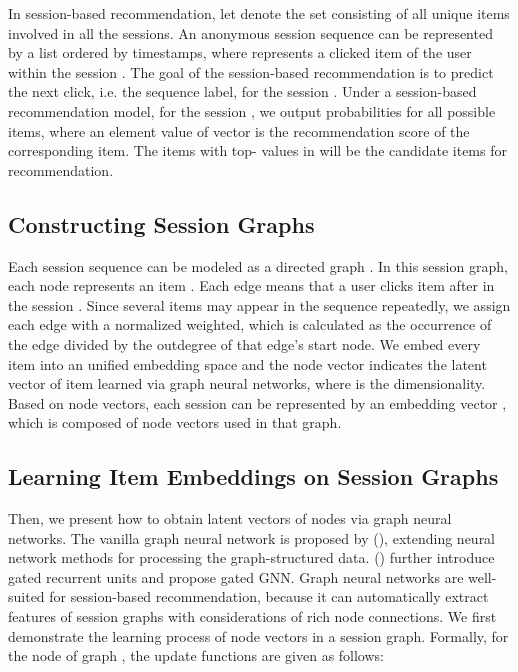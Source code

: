 \documentclass[letterpaper]{article} \usepackage{cite}
\begin{document}
In session-based recommendation, let  denote the set consisting of all unique items involved in all the sessions. An anonymous session sequence  can be represented by a list    ordered by timestamps, where  represents a clicked item of the user within the session . The goal of the session-based recommendation is to predict the next click, i.e. the sequence label,  for the session . Under a session-based recommendation model, for the session , we output probabilities  for all possible items, where an element value of vector  is the recommendation score of the corresponding item. The items with top- values in  will be the candidate items for recommendation.

\subsection{Constructing Session Graphs}

Each session sequence  can be modeled as a directed graph . In this session graph, each node represents an item . Each edge  means that a user clicks item  after  in the session . Since several items may appear in the sequence repeatedly, we assign each edge with a normalized weighted, which is calculated as the occurrence of the edge divided by the outdegree of that edge's start node. We embed every item  into an unified embedding space and the node vector  indicates the latent vector of item  learned via graph neural networks, where  is the dimensionality. Based on node vectors, each session  can be represented by an embedding vector , which is composed of node vectors used in that graph.

\subsection{Learning Item Embeddings on Session Graphs}

Then, we present how to obtain latent vectors of nodes via graph neural networks. The vanilla graph neural network is proposed by \citeauthor{4700287} (\citeyear{4700287}), extending neural network methods for processing the graph-structured data. \citeauthor{DBLP:journals/corr/LiTBZ15} (\citeyear{DBLP:journals/corr/LiTBZ15}) further introduce gated recurrent units and propose gated GNN. Graph neural networks are well-suited for session-based recommendation, because it can automatically extract features of session graphs with considerations of rich node connections. We first demonstrate the learning process of node vectors in a session graph. Formally, for the node  of graph , the update functions are given as follows:
\end{document}

